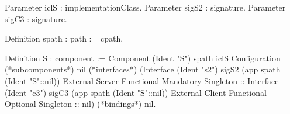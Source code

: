 Parameter iclS : implementationClass.
Parameter sigS2 : signature.
Parameter sigC3 : signature.

Definition spath : path := cpath.

Definition S : component :=
  Component (Ident "S") spath iclS Configuration
     (*subcomponents*) 
      nil
      (*interfaces*) 
      (Interface (Ident "s2") sigS2 (app spath (Ident "S"::nil))
               External Server Functional Mandatory Singleton ::
       Interface (Ident "c3") sigC3 (app spath (Ident "S"::nil))
               External Client Functional Optional Singleton :: nil)
       (*bindings*) 
       nil.
